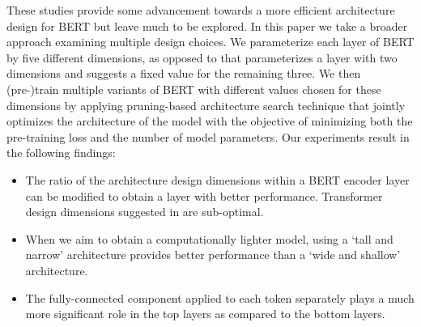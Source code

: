 \documentclass[11pt,a4paper]{article}
\begin{document}
These studies provide some advancement towards a more efficient architecture design for BERT but leave much to be explored. In this paper we take a broader approach examining multiple design choices. We parameterize each layer of BERT by five different dimensions, as opposed to \citet{devlin2018bert} that parameterizes a layer with two dimensions and suggests a fixed value for the remaining three. We then (pre-)train multiple variants of BERT with different values chosen for these dimensions by applying pruning-based architecture search technique that jointly optimizes the architecture of the model with the objective of minimizing both the pre-training loss and the number of model parameters. Our experiments result in the following findings:
% 
% 
\begin{itemize}
    \item The ratio of the architecture design dimensions within a BERT encoder layer can be modified to obtain a layer with better performance. Transformer design dimensions suggested in \citet{vaswani2017attention} are sub-optimal.  
    \vspace{-0.8em}
    \item When we aim to obtain a computationally lighter model, using a `tall and narrow' architecture provides better performance than a `wide and shallow' architecture.
    \vspace{-0.8em}
    \item The fully-connected component applied to each token separately plays a much more significant role in the top layers as compared to the bottom layers. 
\end{itemize}
\end{document}
